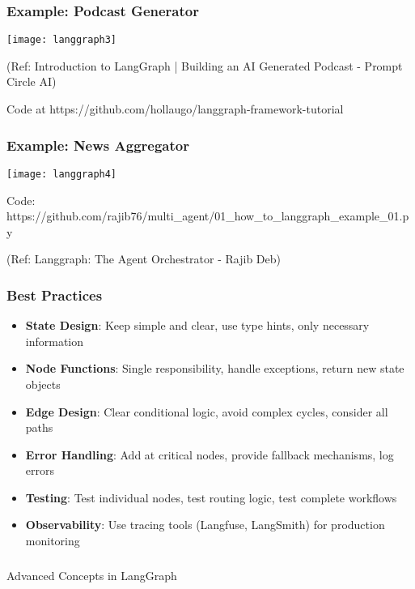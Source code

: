 \begin{frame}\frametitle{Example: Podcast Generator}
\begin{center}
\texttt{[image: langgraph3]}
\end{center}	  
{\tiny (Ref: Introduction to LangGraph | Building an AI Generated Podcast - Prompt Circle AI)}

Code at https://github.com/hollaugo/langgraph-framework-tutorial
\end{frame}

\begin{frame}[fragile]\frametitle{Example: News Aggregator}
\begin{center}
\texttt{[image: langgraph4]}
\end{center}	

Code: https://github.com/rajib76/multi\_agent/01\_how\_to\_langgraph\_example\_01.py

{\tiny (Ref: Langgraph: The Agent Orchestrator - Rajib Deb)}
\end{frame}

\begin{frame}[fragile]\frametitle{Best Practices}
      \begin{itemize}
        \item \textbf{State Design}: Keep simple and clear, use type hints, only necessary information
        \item \textbf{Node Functions}: Single responsibility, handle exceptions, return new state objects
        \item \textbf{Edge Design}: Clear conditional logic, avoid complex cycles, consider all paths
        \item \textbf{Error Handling}: Add at critical nodes, provide fallback mechanisms, log errors
        \item \textbf{Testing}: Test individual nodes, test routing logic, test complete workflows
        \item \textbf{Observability}: Use tracing tools (Langfuse, LangSmith) for production monitoring
      \end{itemize}
\end{frame}

\begin{frame}[fragile]\frametitle{}
\begin{center}
{\Large Advanced Concepts in LangGraph}
\end{center}
\end{frame}

